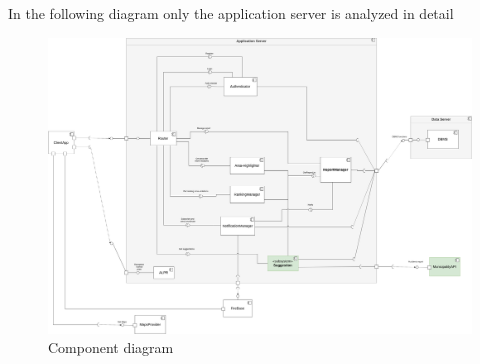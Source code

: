 \documentclass{article}
\begin{document}
In the following diagram only the application server is analyzed in detail

\begin{figure}[!htb]
\centering
	\includegraphics[width=1.0\textwidth]{images/components-diagram.png}
	\caption{Component diagram}
	\label{fig:component-diagram}
\end{figure}
\end{document}
